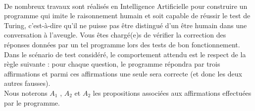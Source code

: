 \documentclass[11pt,a4paper]{article}
\begin{document}
\begin{Exercise}[title = {Logique et calcul des propositions}, origin = {\bac \; {\sc ccp 2015}}]\\
	De nombreux travaux sont réalisés en Intelligence Artificielle pour construire un programme qui imite le raisonnement humain et soit capable de réussir le test de Turing, c’est-à-dire qu’il ne puisse pas être distingué d’un être humain dans une conversation à l’aveugle. Vous êtes chargé(e)s de vérifier la correction des réponses données par un tel programme lors des tests de bon fonctionnement. Dans le scénario de test considéré, le comportement attendu est le respect de la règle suivante : pour chaque question, le programme répondra par trois affirmations et parmi ces affirmations une seule sera correcte (et donc les deux autres fausses). \\
	Nous noterons $A_1$ , $A_2$ et $A_2$ les propositions associées aux affirmations effectuées par le programme.


\end{Exercise}
\end{document}
